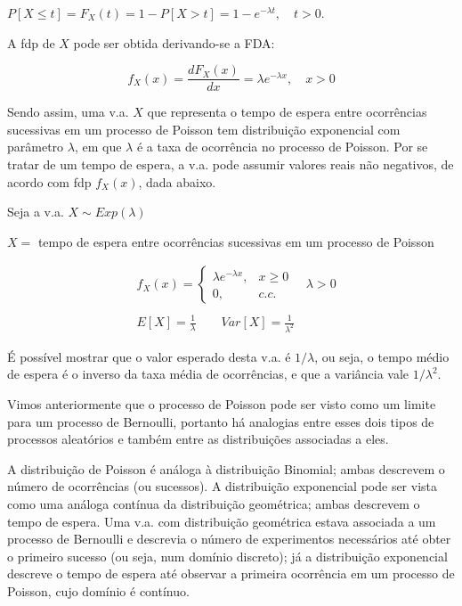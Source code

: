 \documentclass[
]{book}
\theoremstyle{definition}
\theoremstyle{definition}
\theoremstyle{definition}
\theoremstyle{remark}
\begin{document}
\(P[X \leq t] = F_{X}(t) = 1 - P[X > t] = 1 - e^{-\lambda t}, \quad t >0\).

A fdp de \(X\) pode ser obtida derivando-se a FDA:

\[f_{X}(x) =\frac{dF_X(x)}{dx} = \lambda e^{-\lambda x}, \quad x > 0\]

Sendo assim, uma v.a. \(X\) que representa o tempo de espera entre ocorrências sucessivas em um processo de Poisson tem distribuição exponencial com parâmetro \(\lambda\), em que \(\lambda\) é a taxa de ocorrência no processo de Poisson. Por se tratar de um tempo de espera, a v.a. pode assumir valores reais não negativos, de acordo com fdp \(f_X(x)\), dada abaixo.

Seja a v.a. \(X \sim Exp(\lambda)\)

\(X =\) tempo de espera entre ocorrências sucessivas em um processo de Poisson

\begin{align*}
  &{} f_{X}(x) = \left\{
  \begin{array}{rl}
    \lambda e^{-\lambda x}, & x \geq 0\\
    0,           & c.c.
  \end{array}\right.
  \quad \lambda > 0
  \\ \\
  &{} E[X] = \frac{1}{\lambda} \qquad Var[X] = \frac{1}{\lambda^2}
\end{align*}

É possível mostrar que o valor esperado desta v.a. é \(1/\lambda\), ou seja, o tempo médio de espera é o inverso da taxa média de ocorrências, e que a variância vale \(1/\lambda^2\).

Vimos anteriormente que o processo de Poisson pode ser visto como um limite para um processo de Bernoulli, portanto há analogias entre esses dois tipos de processos aleatórios e também entre as distribuições associadas a eles.

A distribuição de Poisson é análoga à distribuição Binomial; ambas descrevem o número de ocorrências (ou sucessos). A distribuição exponencial pode ser vista como uma análoga contínua da distribuição geométrica; ambas descrevem o tempo de espera. Uma v.a. com distribuição geométrica estava associada a um processo de Bernoulli e descrevia o número de experimentos necessários até obter o primeiro sucesso (ou seja, num domínio discreto); já a distribuição exponencial descreve o tempo de espera até observar a primeira ocorrência em um processo de Poisson, cujo domínio é contínuo.
\end{document}
